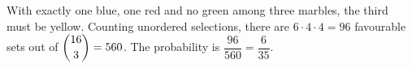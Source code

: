 With exactly one blue, one red and no green among three marbles, the third must be yellow. Counting unordered selections, there are $6\cdot4\cdot4=96$ favourable sets out of $\dbinom{16}{3}=560$. The probability is $\dfrac{96}{560}=\boxed{\dfrac{6}{35}}$.
